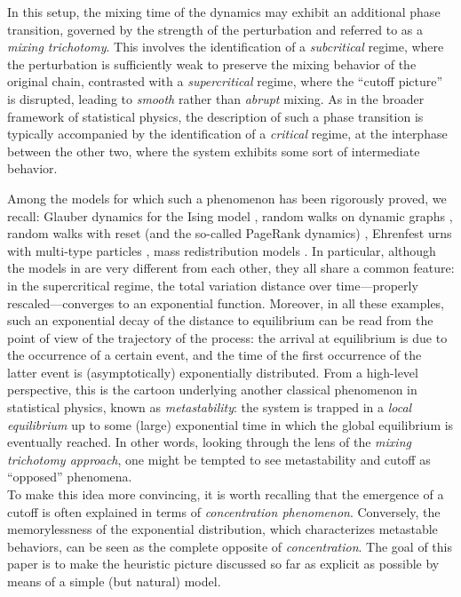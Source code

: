 \documentclass[11pt,oneside]{amsart}
\numberwithin{equation}{section}  %
\theoremstyle{plain}
\begin{document}
In this setup, the mixing time of the dynamics may exhibit an additional phase transition, governed by the strength of the perturbation and referred to as a \emph{mixing trichotomy}. 
This involves the identification of a \emph{subcritical} regime, 
where the perturbation is sufficiently weak to preserve the mixing behavior of the original chain, contrasted with a \emph{supercritical} regime, where the ``cutoff picture'' is disrupted, leading to \emph{smooth} rather than \emph{abrupt} mixing.
As in the broader framework of statistical physics, the description of such a phase transition is typically accompanied by the identification of a \emph{critical} regime, at the interphase between the other two, where the system exhibits some sort of intermediate behavior.

Among the models for which such a phenomenon has been rigorously proved, we recall: Glauber dynamics for the Ising model \cite{LSg1,LSg2}, random walks on dynamic graphs \cite{AGHH19,AGHH22,CQ21b}, random walks with reset (and the so-called PageRank dynamics) \cite{CQ21a,VS}, Ehrenfest urns with multi-type particles \cite{Q24}, mass redistribution models \cite{CQS24}. 
In particular, although the models in \cite{AGHH19,CQ21a,CQ21b} are very different from each other, they all share a common feature: in the supercritical regime, the total variation distance over time---properly rescaled---converges to an exponential function. Moreover, in all these examples, such an exponential decay of the distance to equilibrium can be read from the point of view of the trajectory of the process: the arrival at equilibrium is due to the occurrence of a certain event, and the time of the first occurrence of the latter event is (asymptotically) exponentially distributed. From a high-level perspective, this is the cartoon underlying another classical phenomenon in statistical physics, known as \emph{metastability}: the system is trapped in a \emph{local equilibrium} up to some (large) exponential time in which the global equilibrium is eventually reached. In other words, looking through the lens of the \emph{mixing trichotomy approach}, one might be tempted to see metastability and cutoff as ``opposed'' phenomena.\\
To make this idea more convincing, it is worth recalling that the emergence of a cutoff
is often explained in terms of \emph{concentration phenomenon}. 
Conversely, the memorylessness of the exponential distribution, which characterizes metastable behaviors, 
can be seen as the complete opposite of \emph{concentration}. 
%
The goal of this paper is to make the heuristic picture discussed so far as explicit as possible by means of a simple (but natural) model. 
\end{document}
